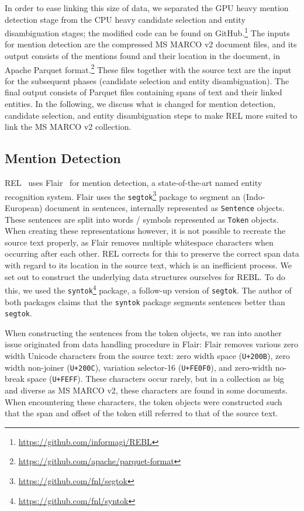 In order to ease linking this size of data, we separated the GPU heavy mention detection stage from the CPU heavy candidate selection and entity disambiguation stages; the modified code can be found on GitHub.\footnote{\url{https://github.com/informagi/REBL}}
The inputs for mention detection are the compressed MS MARCO v2 document files, and its output consists of the mentions found and their location in the document, in Apache Parquet format.\footnote{\url{https://github.com/apache/parquet-format}}
These files together with the source text are the input for the subsequent phases (candidate selection and entity disambiguation). The final output consists of Parquet files containing spans of text and their linked entities. 
In the following, we discuss what is changed for mention detection, candidate selection, and entity disambiguation steps to make REL more suited to link the MS MARCO v2 collection.  

\subsection{Mention Detection}
REL~\cite{REL} uses Flair~\cite{flair} for mention detection, a state-of-the-art named entity recognition system. Flair uses the \texttt{segtok}\footnote{\url{https://github.com/fnl/segtok}} package to segment an (Indo-European) document in sentences, internally represented as \texttt{Sentence} objects. These sentences are split into words / symbols represented as \texttt{Token} objects. When creating these representations however, it is not possible to recreate the source text properly, as Flair removes multiple whitespace characters when occurring after each other. REL corrects for this to preserve the correct span data with regard to its location in the source text, which is an inefficient process.
We set out to construct the underlying data structures ourselves for REBL. To do this, we used the \texttt{syntok}\footnote{\url{https://github.com/fnl/syntok}} package, a follow-up version of \texttt{segtok}. The author of both packages claims that the \texttt{syntok} package segments sentences better than \texttt{segtok}. 

When constructing the sentences from the token objects, we ran into another issue originated from data handling procedure in Flair: Flair removes various zero width Unicode characters from the source text: zero width space (\texttt{U+200B}), zero width non-joiner (\texttt{U+200C}), variation selector-16 (\texttt{U+FE0F0}), and zero-width no-break space (\texttt{U+FEFF}). These characters occur rarely, but in a collection as big and diverse as MS MARCO v2, these characters are found in some documents. When encountering these characters, the token objects were constructed such that the span and offset of the token still referred to that of the source text.

